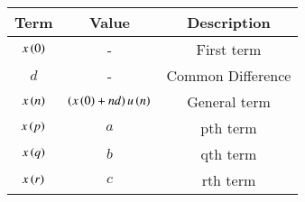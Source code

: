\begin{tabular}{|c|c|c|}
    \hline
    \textbf{Term} & \textbf{Value} & \textbf{Description}\\
    \hline
    $x\left(0\right)$ & - & First term\\
    \hline
    $d$ & - & Common Difference\\
    \hline
    $x\left(n\right)$ & $\left(x\left(0\right)+nd\right)u\left(n\right)$ & General term\\
    \hline
    $x\left(p\right)$ & $a$ & pth term\\
    \hline
    $x\left(q\right)$ & $b$ & qth term\\
    \hline
    $x\left(r\right)$ & $c$ & rth term\\
    \hline
  \end{tabular}
  
